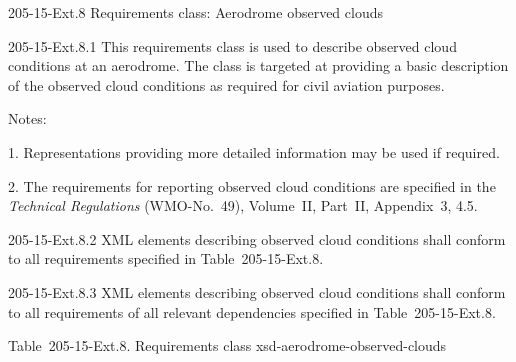 205-15-Ext.8 Requirements class: Aerodrome observed clouds

205-15-Ext.8.1 This requirements class is used to describe observed cloud conditions at an aerodrome. The class is targeted at providing a basic description of the observed cloud conditions as required for civil aviation purposes.

Notes:

1. Representations providing more detailed information may be used if required.

2. The requirements for reporting observed cloud conditions are specified in the \emph{Technical Regulations} (WMO-No.~49), Volume~II, Part~II, Appendix~3, 4.5.

205-15-Ext.8.2 XML elements describing observed cloud conditions shall conform to all requirements specified in Table~205-15-Ext.8.

205-15-Ext.8.3 XML elements describing observed cloud conditions shall conform to all requirements of all relevant dependencies specified in Table~205-15-Ext.8.

Table~205-15-Ext.8. Requirements class xsd-aerodrome-observed-clouds

